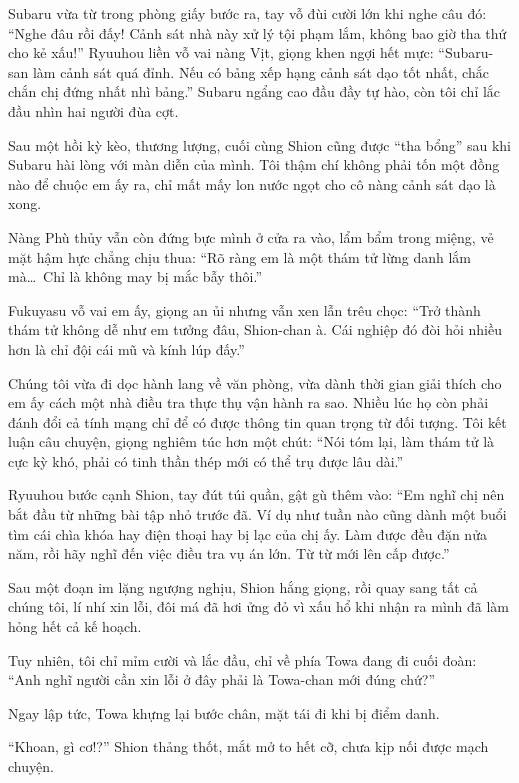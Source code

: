 \documentclass[../main.tex]{subfiles}
\begin{document}
Subaru vừa từ trong phòng giấy bước ra, tay vỗ đùi cười lớn khi nghe câu đó: ``Nghe đâu rồi đấy! Cảnh sát nhà này xử lý tội phạm lắm, không bao giờ tha thứ cho kẻ xấu!'' Ryuuhou liền vỗ vai nàng Vịt, giọng khen ngợi hết mực: ``Subaru-san làm cảnh sát quá đỉnh. Nếu có bảng xếp hạng cảnh sát dạo tốt nhất, chắc chắn chị đứng nhất nhì bảng.'' Subaru ngẩng cao đầu đầy tự hào, còn tôi chỉ lắc đầu nhìn hai người đùa cợt.

Sau một hồi kỳ kèo, thương lượng, cuối cùng Shion cũng được ``tha bổng'' sau khi Subaru hài lòng với màn diễn của mình. Tôi thậm chí không phải tốn một đồng nào để chuộc em ấy ra, chỉ mất mấy lon nước ngọt cho cô nàng cảnh sát dạo là xong.

Nàng Phù thủy vẫn còn đứng bực mình ở cửa ra vào, lẩm bẩm trong miệng, vẻ mặt hậm hực chẳng chịu thua: ``Rõ ràng em là một thám tử lừng danh lắm mà\dots\ Chỉ là không may bị mắc bẫy thôi.''

Fukuyasu vỗ vai em ấy, giọng an ủi nhưng vẫn xen lẫn trêu chọc: ``Trở thành thám tử không dễ như em tưởng đâu, Shion-chan à. Cái nghiệp đó đòi hỏi nhiều hơn là chỉ đội cái mũ và kính lúp đấy.''

Chúng tôi vừa đi dọc hành lang về văn phòng, vừa dành thời gian giải thích cho em ấy cách một nhà điều tra thực thụ vận hành ra sao. Nhiều lúc họ còn phải đánh đổi cả tính mạng chỉ để có được thông tin quan trọng từ đối tượng. Tôi kết luận câu chuyện, giọng nghiêm túc hơn một chút: ``Nói tóm lại, làm thám tử là cực kỳ khó, phải có tinh thần thép mới có thể trụ được lâu dài.''

Ryuuhou bước cạnh Shion, tay đút túi quần, gật gù thêm vào: ``Em nghĩ chị nên bắt đầu từ những bài tập nhỏ trước đã. Ví dụ như tuần nào cũng dành một buổi tìm cái chìa khóa hay điện thoại hay bị lạc của chị ấy. Làm được đều đặn nửa năm, rồi hãy nghĩ đến việc điều tra vụ án lớn. Từ từ mới lên cấp được.''

Sau một đoạn im lặng ngượng nghịu, Shion hắng giọng, rồi quay sang tất cả chúng tôi, lí nhí xin lỗi, đôi má đã hơi ửng đỏ vì xấu hổ khi nhận ra mình đã làm hỏng hết cả kế hoạch.

Tuy nhiên, tôi chỉ mỉm cười và lắc đầu, chỉ về phía Towa đang đi cuối đoàn: ``Anh nghĩ người cần xin lỗi ở đây phải là Towa-chan mới đúng chứ?''

Ngay lập tức, Towa khựng lại bước chân, mặt tái đi khi bị điểm danh.

``Khoan, gì cơ!?'' Shion thảng thốt, mắt mở to hết cỡ, chưa kịp nối được mạch chuyện.
\end{document}
